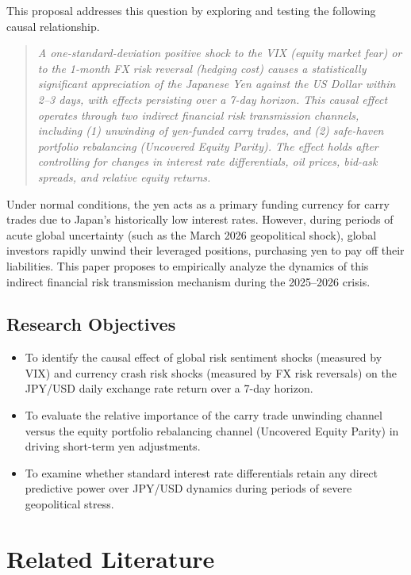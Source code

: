\documentclass[12pt]{article}
\begin{document}
{} This proposal addresses this question by exploring and testing the following causal relationship.

\begin{quote}
\itshape
A one-standard-deviation positive shock to the VIX (equity market fear) or to the 1-month FX risk reversal (hedging cost) causes a statistically significant appreciation of the Japanese Yen against the US Dollar within 2–3 days, with effects persisting over a 7-day horizon. This causal effect operates through two indirect financial risk transmission channels, including (1) unwinding of yen-funded carry trades, and (2) safe-haven portfolio rebalancing (Uncovered Equity Parity). The effect holds after controlling for changes in interest rate differentials, oil prices, bid-ask spreads, and relative equity returns.
\end{quote}

{} Under normal conditions, the yen acts as a primary funding currency for carry trades due to Japan's historically low interest rates. However, during periods of acute global uncertainty (such as the March 2026 geopolitical shock), global investors rapidly unwind their leveraged positions, purchasing yen to pay off their liabilities. This paper proposes to empirically analyze the dynamics of this indirect financial risk transmission mechanism during the 2025–2026 crisis.

\subsection{Research Objectives}
\begin{itemize}
    \item To identify the causal effect of global risk sentiment shocks (measured by VIX) and currency crash risk shocks (measured by FX risk reversals) on the JPY/USD daily exchange rate return over a 7-day horizon.
    \item To evaluate the relative importance of the carry trade unwinding channel versus the equity portfolio rebalancing channel (Uncovered Equity Parity) in driving short-term yen adjustments.
    \item To examine whether standard interest rate differentials retain any direct predictive power over JPY/USD dynamics during periods of severe geopolitical stress.
\end{itemize}

\section{Related Literature}
\end{document}
